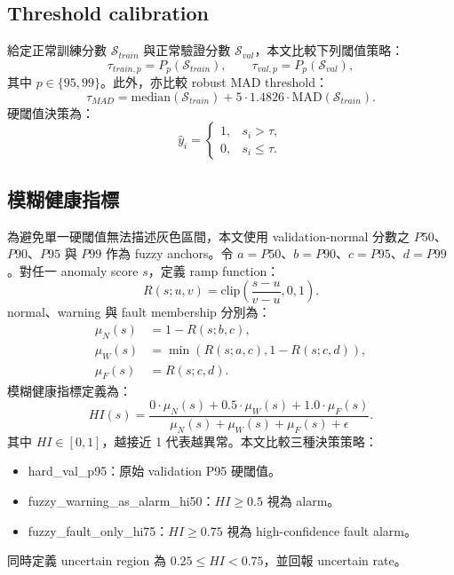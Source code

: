\documentclass[sn-mathphys-num]{sn-jnl}
\newcommand{\hi}{HI}
\begin{document}
\subsection{Threshold calibration}

給定正常訓練分數 $\mathcal{S}_{train}$ 與正常驗證分數 $\mathcal{S}_{val}$，本文比較下列閾值策略：
\begin{equation}
\tau_{train,p} = P_p(\mathcal{S}_{train}), \qquad
\tau_{val,p} = P_p(\mathcal{S}_{val}),
\end{equation}
其中 $p\in\{95,99\}$。此外，亦比較 robust MAD threshold：
\begin{equation}
\tau_{MAD}= \mathrm{median}(\mathcal{S}_{train})+
5\cdot 1.4826\cdot \mathrm{MAD}(\mathcal{S}_{train}).
\end{equation}
硬閾值決策為：
\begin{equation}
\hat{y}_i =
\begin{cases}
1, & s_i > \tau,\\
0, & s_i \leq \tau.
\end{cases}
\end{equation}

\subsection{模糊健康指標}

為避免單一硬閾值無法描述灰色區間，本文使用 validation-normal 分數之 $P50$、$P90$、$P95$ 與 $P99$ 作為 fuzzy anchors。令 $a=P50$、$b=P90$、$c=P95$、$d=P99$。對任一 anomaly score $s$，定義 ramp function：
\begin{equation}
R(s;u,v)=\mathrm{clip}\left(\frac{s-u}{v-u},0,1\right).
\end{equation}
normal、warning 與 fault membership 分別為：
\begin{align}
\mu_N(s)&=1-R(s;b,c),\\
\mu_W(s)&=\min(R(s;a,c),1-R(s;c,d)),\\
\mu_F(s)&=R(s;c,d).
\end{align}
模糊健康指標定義為：
\begin{equation}
\hi(s)=\frac{0\cdot\mu_N(s)+0.5\cdot\mu_W(s)+1.0\cdot\mu_F(s)}
{\mu_N(s)+\mu_W(s)+\mu_F(s)+\epsilon}.
\end{equation}
其中 $\hi \in [0,1]$，越接近 1 代表越異常。本文比較三種決策策略：
\begin{itemize}
  \item hard\_val\_p95：原始 validation P95 硬閾值。
  \item fuzzy\_warning\_as\_alarm\_hi50：$\hi \geq 0.5$ 視為 alarm。
  \item fuzzy\_fault\_only\_hi75：$\hi \geq 0.75$ 視為 high-confidence fault alarm。
\end{itemize}
同時定義 uncertain region 為 $0.25 \leq \hi < 0.75$，並回報 uncertain rate。
\end{document}
